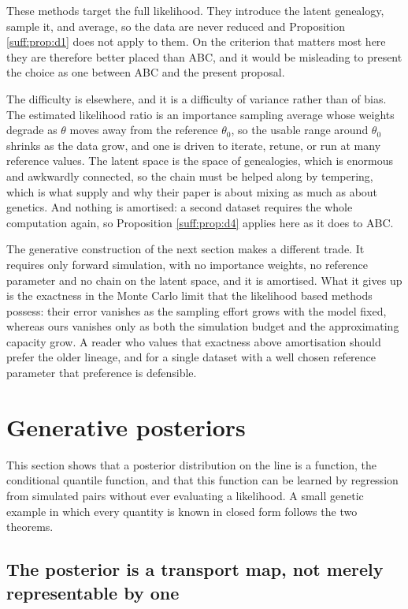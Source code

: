 These methods target the full likelihood. They introduce the latent genealogy, sample it, and
average, so the data are never reduced and Proposition \ref{suff:prop:d1} does not apply to
them. On the criterion that matters most here they are therefore better placed than ABC, and
it would be misleading to present the choice as one between ABC and the present proposal.

The difficulty is elsewhere, and it is a difficulty of variance rather than of bias. The
estimated likelihood ratio is an importance sampling average whose weights degrade as $\theta$
moves away from the reference $\theta_0$, so the usable range around $\theta_0$ shrinks as the
data grow, and one is driven to iterate, retune, or run at many reference values. The latent
space is the space of genealogies, which is enormous and awkwardly connected, so the chain
must be helped along by tempering, which is what \citet{suff:geyerthompson1995} supply and
why their paper is about mixing as much as about genetics. And nothing is amortised: a second
dataset requires the whole computation again, so Proposition \ref{suff:prop:d4} applies here
as it does to ABC.

The generative construction of the next section makes a different trade. It requires only
forward simulation, with no importance weights, no reference parameter and no chain on the
latent space, and it is amortised. What it gives up is the exactness in the Monte Carlo limit
that the likelihood based methods possess: their error vanishes as the sampling effort grows
with the model fixed, whereas ours vanishes only as both the simulation budget and the
approximating capacity grow. A reader who values that exactness above amortisation should
prefer the older lineage, and for a single dataset with a well chosen reference parameter that
preference is defensible.

\section{Generative posteriors}
\label{suff:sec:gbc}

This section shows that a posterior distribution on the line is a function, the conditional
quantile function, and that this function can be learned by regression from simulated pairs
without ever evaluating a likelihood. A small genetic example in which every quantity is
known in closed form follows the two theorems.

\subsection{The posterior is a transport map, not merely representable by one}

